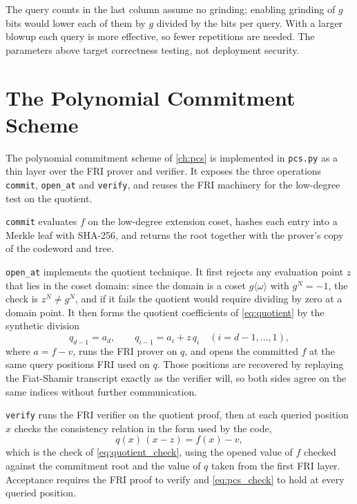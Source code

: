 The query counts in the last column assume no grinding; enabling
grinding of $g$ bits would lower each of them by $g$ divided by the bits
per query. With a larger blowup each query is more effective, so fewer 
repetitions are needed. The parameters above target correctness testing, 
not deployment security.


\section{The Polynomial Commitment Scheme}
\label{sec:impl_pcs}

The polynomial commitment scheme of \cref{ch:pcs} is implemented in
\texttt{pcs.py} as a thin layer over the FRI prover and verifier. It
exposes the three operations \texttt{commit}, \texttt{open\_at} and
\texttt{verify}, and reuses the FRI machinery for the low-degree test on
the quotient.

\texttt{commit} evaluates $f$ on the low-degree extension coset, hashes
each entry into a Merkle leaf with SHA-256, and returns the root together
with the prover's copy of the codeword and tree.

\texttt{open\_at} implements the quotient technique. It first rejects any
evaluation point $z$ that lies in the coset domain: since the domain is a
coset $g\langle\omega\rangle$ with $g^N = -1$, the check is $z^N \neq
g^N$, and if it fails the quotient would require dividing by zero at a
domain point. It then forms the quotient coefficients of
\cref{eq:quotient} by the synthetic division
%
\[
q_{d-1} = a_d, \qquad q_{i-1} = a_i + z\,q_i \quad (i = d-1, \ldots, 1),
\]
%
where $a = f - v$, runs the FRI prover on $q$, and opens the committed
$f$ at the same query positions FRI used on $q$. Those positions are
recovered by replaying the Fiat-Shamir transcript exactly as the verifier
will, so both sides agree on the same indices without further
communication.

\texttt{verify} runs the FRI verifier on the quotient proof, then at each
queried position $x$ checks the consistency relation in the form used by
the code,
%
\begin{equation}
\label{eq:pcs_check}
q(x)\,(x - z) = f(x) - v,
\end{equation}
%
which is the check of \cref{eq:quotient_check}, using the opened value of
$f$ checked against the commitment root and the value of $q$ taken from
the first FRI layer. Acceptance requires the FRI proof to verify and
\cref{eq:pcs_check} to hold at every queried position.

